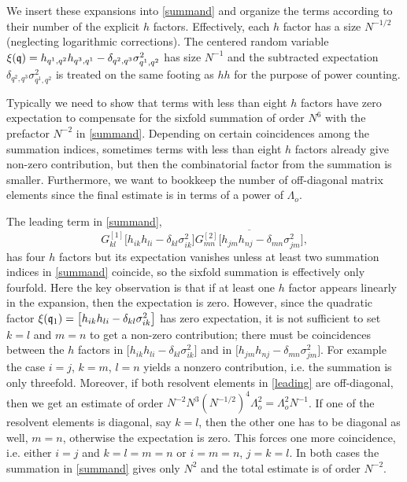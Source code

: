 \documentclass[draft]{article}
\newcommand{\fq}{{\frak q}}
\newcommand{\be}{\begin{equation}}
\newcommand{\ee}{\end{equation}}
\newcommand{\ov}{\overline}
\numberwithin{equation}{section}
\numberwithin{theorem}{section}
\numberwithin{definition}{section}
\numberwithin{remark}{section}
\begin{document}
We insert these expansions into \eqref{summand}
and organize the terms according to their number of the
explicit $h$ factors. Effectively, each $h$ factor has
a size $N^{-1/2}$ (neglecting logarithmic corrections). The 
centered random variable $\xi(\fq)= h_{q^1, q^2}h_{q^3, q^1}-\delta_{q^2,q^3}\sigma^2_{q^1,q^2}$ has size $N^{-1}$
and the subtracted expectation $\delta_{q^2,q^3}\sigma^2_{q^1,q^2}$ 
is treated on the same footing as $hh$ for the purpose of power counting.



Typically we need to show that terms with less than
 eight $h$ factors have zero expectation
to compensate for the sixfold summation of order $N^6$
with the prefactor $N^{-2}$  in \eqref{summand}.
Depending on certain coincidences among the 
summation indices, sometimes terms with less than eight $h$ factors
already give non-zero contribution, but then the combinatorial
factor from the summation is smaller.
Furthermore, we want to bookkeep the number of off-diagonal
matrix elements since the final estimate is in
terms of a power of $\Lambda_o$.


The leading term in \eqref{summand},
\be\label{leading}
   G^{[1]}_{kl} \big[ h_{ik}h_{li} - \delta_{kl}\sigma_{ik}^2\big]
  \ov{G_{mn}^{[2]} \big[ h_{jm}h_{nj} - \delta_{mn}\sigma_{jm}^2\big]},
\ee
has four $h$ factors  but its  expectation
vanishes unless at least two summation indices in \eqref{summand}
coincide, so the sixfold summation
is effectively only fourfold. Here the key observation is that if at least one
$h$ factor  appears linearly in the expansion, then 
the expectation is zero.
However, since 
the quadratic factor $\xi(\fq_1)=\big[ h_{ik}h_{li} - \delta_{kl}\sigma_{ik}^2\big]$
has zero expectation, it is not sufficient to
set $k=l$ and $m=n$ to get a non-zero contribution;
there must be coincidences between the $h$ factors
in $\big[ h_{ik}h_{li} - \delta_{kl}\sigma_{ik}^2\big]$
and in $\big[ h_{jm}h_{nj} - \delta_{mn}\sigma_{jm}^2\big]$.
For example the case $i=j$, $k=m$, $l=n$ yields a nonzero
contribution, i.e. the summation is only threefold.
Moreover, if both resolvent elements in \eqref{leading}
are off-diagonal, then
we get an estimate of order $N^{-2}N^3 (N^{-1/2})^4\Lambda_o^2
=\Lambda_o^2N^{-1} $.
If one of the resolvent elements is diagonal,
say $k=l$, then the other one has to be diagonal
as well, $m=n$, otherwise the expectation is zero. 
This forces one more coincidence, i.e.
either $i=j$ and $k=l=m=n$ or $i=m=n$, $j=k=l$.
In both cases the summation in \eqref{summand} gives only 
$N^2$ and the total estimate is of order $N^{-2}$.
\end{document}
